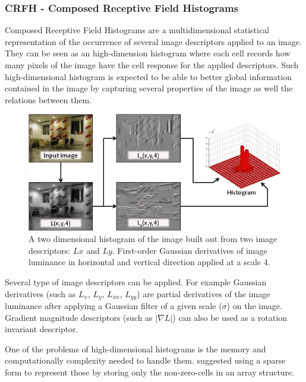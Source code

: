 \subsubsection{{CRFH} - Composed Receptive Field Histograms}
\label{sec:crfh}\label{sec:global-features}
Composed Receptive Field Histograms are a multidimensional statistical
representation of the occurrence of several image descriptors applied to an
image. They can be seen as an high-dimension histogram where each cell records
how many pixels of the image have the cell response for the applied descriptors.
Such high-dimensional histogram is expected to be able to better global
information contained in the image by capturing several properties of the image
as well the relations between them.


\begin{figure}[h]
\begin{center}
\includegraphics[width=1\textwidth]{figures/crfh_model.jpg}
\end{center}
\caption{A two dimensional histogram of the image built out from two image
         descriptors: $Lx$ and $Ly$. First-order Gaussian derivatives of image
         luminance in horizontal and vertical direction applied at a scale 4.}
\end{figure}

Several type of image descriptors can be applied.
For example Gaussian derivatives (such as $L_x$, $L_y$, $L_{xx}$, $L_{yy}$) are
partial derivatives of the image luminance after applying a Gaussian filter of a
given scale ($\sigma$) on the image. Gradient magnitude descriptors
(such as $|\nabla L|$) can also be used as a rotation invariant descriptor.


One of the problems of high-dimensional histograms is the memory and
computationally complexity needed to handle them.
\cite{linde2004object} suggested using a sparse form to represent those by
storing only the non-zero-cells in an array structure.

